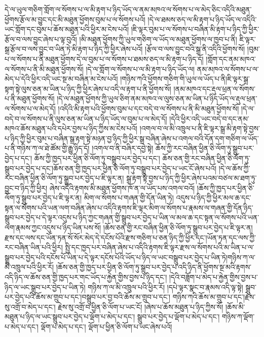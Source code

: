 དེ་ལ་ཡུལ་གཅིག་གློག་ལ་སོགས་པ་ལ་མི་རྟག་པ་ཉིད་ཡོད་ལ་ནམ་མཁའ་ལ་སོགས་པ་ལ་མེད་ཅིང་འདིའི་མཐུན་ཕྱོགས་རྩོལ་མ་བྱུང་དང་མི་མཐུན་ཕྱོགས་བུམ་པ་ལ་སོགས་པའོ། །དེ་ལ་ཐམས་ཅད་ལ་མི་རྟག་པ་ཉིད་ཡོད་ལ་འདིའི་ཡང་གློག་དང་བུམ་པ་ཆོས་མཐུན་པའི་ཕྱིར་མ་ངེས་པའོ། །ཇི་ལྟར་བུམ་པ་ལ་སོགས་པ་བཞིན་མི་རྟག་པ་ཉིད་ཀྱི་ཕྱིར་རྩོལ་བ་ལས་བྱུང་ཞེས་པ་ལྟ་བུའོ། །མི་མཐུན་ཕྱོགས་ཀྱི་ཡུལ་གཅིག་ལ་ཡོད་ལ་མཐུན་ཕྱོགས་ལ་ཁྱབ་པ་ནི། ཇི་ལྟར་སྒྲ་རྩོལ་བ་ལས་བྱུང་བ་ཡིན་ཏེ་མི་རྟག་པ་ཉིད་ཀྱི་ཕྱིར་ཞེས་པའོ། །རྩོལ་བ་ལས་བྱུང་བའི་སྒྲ་ནི་འདིའི་ཕྱོགས་སོ། །བུམ་པ་ལ་སོགས་པ་ནི་མཐུན་ཕྱོགས་དེ་ལ་བུམ་པ་ལ་སོགས་པ་ཐམས་ཅད་ལ་མི་རྟག་པ་ཉིད་དོ། །གློག་དང་ནམ་མཁའ་ལ་སོགས་པ་ནི་མི་མཐུན་ཕྱོགས་སོ། །དེ་ལ་གློག་ལ་སོགས་པ་ལ་མི་རྟག་པ་ཉིད་ཡོད་ལ། ནམ་མཁའ་ལ་སོགས་པ་ལ་མེད་པ་དེའི་ཕྱིར་འདི་ཡང་སྔ་མ་བཞིན་མ་ངེས་པའོ། །གཉིས་ཀའི་ཕྱོགས་གཅིག་གི་ཡུལ་ལ་ཡོད་པ་ནི།ཇི་ལྟར་སྒྲ་སྟག་སྟེ་ལུས་ཅན་མ་ཡིན་པ་ཉིད་ཀྱི་ཕྱིར་ཞེས་པ་འདི་ལ་རྟག་པ་ནི་ཕྱོགས་སོ། །ནམ་མཁའ་དང་རྡུལ་ཕྲན་ལ་སོགས་པ་ནི་མཐུན་ཕྱོགས་སོ། །དེ་ལ་མཐུན་ཕྱོགས་ཀྱི་ཡུལ་ཅིག་ནམ་མཁའ་ལ་ལུས་ཅན་མ་ཡིན་པ་ཉིད་ཡོད་ལ་རྡུལ་ཕྲན་ལ་སོགས་པ་ལ་མེད་དོ། །འདིའི་མི་རྟག་པའི་ཕྱོགས་བུམ་པ་དང་བདེ་བ་ལ་སོགས་པ་ནི་མི་མཐུན་ཕྱོགས་སོ། །དེ་ལ་བདེ་བ་ལ་སོགས་པ་ནི་ལུས་ཅན་མ་ཡིན་པ་ཉིད་ཡོད་ལ་བུམ་པ་ལ་མེད་དོ། །དེའི་ཕྱིར་འདི་ཡང་བདེ་བ་དང་ནམ་མཁའ་ཆོས་མཐུན་པའི་དཔེར་བྱས་པ་ཉིད་ཀྱིས་མ་ངེས་པའོ། །འགལ་བ་ལ་མི་འཁྲུལ་པ་ནི་ཇི་ལྟར་སྒྲ་མི་རྟག་སྟེ་བྱས་པ་ཉིད་ཀྱི་ཕྱིར་བུམ་པ་བཞིན་སྒྲ་རྟག་སྟེ་མཉན་བྱ་ཉིད་ཀྱི་ཕྱིར་སྒྲ་བཞིན་ཞེས་པ་འགལ་བའི་དོན་དག་གཅིག་ལ་ཡོད་པ་ནི་གཉིས་ཀ་ལ་ཐེ་ཚོམ་གྱི་རྒྱུ་ཉིད་དོ། །འགལ་བ་ནི་བཞིར་དབྱེ་སྟེ། ཆོས་ཀྱི་རང་བཞིན་ཕྱིན་ཅི་ལོག་ཏུ་སྒྲུབ་པར་བྱེད་པ་དང་། ཆོས་ཀྱི་ཁྱད་པར་ཕྱིན་ཅི་ལོག་ཏུ་བསྒྲུབ་པར་བྱེད་པ་དང་། ཆོས་ཅན་གྱི་རང་བཞིན་ཕྱིན་ཅི་ལོག་ཏུ་སྒྲུབ་པར་བྱེད་པ་དང་།ཆོས་ཅན་གྱི་ཁྱད་པར་ཕྱིན་ཅི་ལོག་ཏུ་བསྒྲུབ་པར་བྱེད་པ་ཡང་ངོ་ཞེས་པའོ། །དེ་ལ་ཆོས་ཀྱི་རང་བཞིན་ཕྱིན་ཅི་ལོག་ཏུ་སྒྲུབ་པར་བྱེད་པ་ཇི་ལྟར་ན། སྒྲ་རྟག་སྟེ་བྱས་པ་ཉིད་ཀྱི་ཕྱིར་ཞེས་པའམ་བཙལ་མ་ཐག་ཏུ་བྱུང་བ་ཉིད་ཀྱི་ཕྱིར། ཞེས་འདིའི་རྟགས་མི་མཐུན་ཕྱོགས་ཁོ་ན་ལ་ཡོད་པས་འགལ་བའོ། །ཆོས་ཀྱི་ཁྱད་པར་ཕྱིན་ཅི་ལོག་ཏུ་སྒྲུབ་པར་བྱེད་པ་ཇི་ལྟར་ན། མིག་ལ་སོགས་པ་གཞན་གྱི་དོན་ཡིན་ཏེ། འདུས་པ་ཉིད་ཀྱི་ཕྱིར་མལ་ཆ་དང་སྟན་ལ་སོགས་པའི་ཡན་ལག་བཞིན་ཞེས་པ་འདིའི་རྟགས་ཇི་ལྟར་མིག་ལ་སོགས་པ་རྣམས་ལ་གཞན་གྱི་དོན་ཉིད་སྒྲུབ་པར་བྱེད་པ་དེ་ལྟར་འདུས་པ་ཉིད་ཀྱང་གཞན་གྱི་སྒྲུབ་པར་བྱེད་པ་ཡིན་ལ་མལ་ཆ་དང་སྟན་ལ་སོགས་པའི་ཡན་ལག་རྣམས་ཀྱང་འདུས་པ་ཉིད་ཡིན་པས་སོ། །ཆོས་ཅན་གྱི་རང་བཞིན་ཕྱིན་ཅི་ལོག་ཏུ་སྒྲུབ་པར་བྱེད་པ་ཇི་ལྟར་ན། རྫས་དང་ལས་དང་ཡོན་ཏན་སོ་སོར་མེད་དེ་དངོས་པོའི་རྫས་གཅིག་པ་ཅན་ཉིད་ཀྱི་ཕྱིར་དང་།ཡོན་ཏན་དང་ལས་ཀྱི་རང་བཞིན་ཡིན་པའི་ཕྱིར། སྤྱི་དང་ཁྱད་པར་བཞིན་ཞེས་པ་འདིའི་རྟགས་ཇི་ལྟར་རྫས་ལ་སོགས་པའི་མ་ཡིན་པ་ལ་སྒྲུབ་པར་བྱེད་པའི་དངོས་པོ་ཡིན་པ་དེ་ལྟར་དངོས་པོའི་ཡོད་པ་ཉིད་ལ་ཡང་བསྒྲུབ་པར་བྱེད་པ་ཡིན་ཏེ།གཉིས་ཀ་ལ་མི་འཁྲུལ་པའི་ཕྱིར་རོ། །ཆོས་ཅན་གྱི་ཁྱད་པར་ཕྱིན་ཅི་ལོག་ཏུ་སྒྲུབ་པར་བྱེད་པ་འདི་ཉིད་ནི་ཕྱོགས་སྔ་མའི་རྟགས་འདི་ཉིད་ལ་ཆོས་ཅན་གྱི་ཁྱད་པར་གང་ཡོད་པ་རྐྱེན་གྱིས་བྱས་པ་ཉིད་དང་། །དེའི་བཟློག་པ་མེད་པ་རྐྱེན་གྱིས་བྱས་པ་ཉིད་ལ་ཡང་སྒྲུབ་པར་བྱེད་པ་ཡིན་ཏེ། གཉིས་ཀ་ལ་མི་འཁྲུལ་པའི་ཕྱིར་རོ། །དཔེ་ལྟར་སྣང་བ་རྣམས་འདི་ལྟ་སྟེ། སྒྲུབ་པར་བྱེད་པའི་ཆོས་མ་གྲུབ་པ་དང་།བསྒྲུབ་པར་བྱ་བའི་ཆོས་མ་གྲུབ་པ་དང་། གཉིས་ཀའི་ཆོས་མ་གྲུབ་པ་དང་།རྗེས་སུ་འགྲོ་བ་མེད་པ་དང་། རྗེས་སུ་འགྲོ་བ་ཕྱིན་ཅི་ལོག་པ་ཡང་ངོ། །ཞེས་པ་ཆོས་མཐུན་པ་ཉིད་ཀྱིས་སོ། །ཆོས་མི་མཐུན་པ་ཉིད་ལ་ཡང་སྒྲུབ་པར་བྱེད་པ་ལྡོག་པ་མེད་པ་དང་། སྒྲུབ་པར་བྱེད་པ་ལྡོག་པ་མེད་པ་དང་། གཉིས་ཀ་ལྡོག་པ་མེད་པ་དང་། ལྡོག་པ་མེད་པ་དང་། ལྡོག་པ་ཕྱིན་ཅི་ལོག་པ་ཡང་ཞེས་པའོ། 